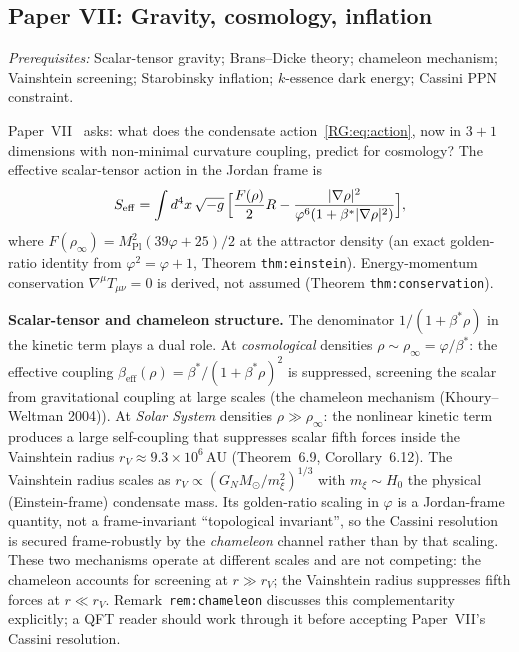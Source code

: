 \documentclass[11pt,a4paper]{article}
\newcommand{\vp}{\varphi}
\newcommand{\bst}{\beta^*}
\begin{document}
\subsection{Paper VII: Gravity, cosmology, inflation}

\textit{Prerequisites:} Scalar-tensor gravity; Brans--Dicke theory; chameleon
mechanism; Vainshtein screening;
Starobinsky inflation; $k$-essence dark energy; Cassini PPN constraint.

Paper~VII~\cite{Paper7} asks: what does the condensate action~\eqref{RG:eq:action}, now in $3+1$
dimensions with non-minimal curvature coupling, predict for cosmology?
The effective scalar-tensor action in the Jordan frame is
\begin{equation}
  S_{\mathrm{eff}} = \int d^4x\,\sqrt{-g}\,
  \Bigl[\frac{F(\rho)}{2}R - \frac{|\nabla\rho|^2}{\vp^6(1+\bst|\nabla\rho|^2)}\Bigr],
  \label{RG:eq:Seff}
\end{equation}
where $F(\rho_\infty) = M_{\mathrm{Pl}}^2(39\vp+25)/2$ at the attractor density
(an exact golden-ratio identity from $\vp^2=\vp+1$, Theorem \texttt{thm:einstein}).
Energy-momentum conservation $\nabla^\mu T_{\mu\nu}=0$ is derived, not assumed
(Theorem \texttt{thm:conservation}).

\textbf{Scalar-tensor and chameleon structure.}
The denominator $1/(1+\bst\rho)$ in the kinetic term plays a dual role.
At \emph{cosmological} densities $\rho\sim\rho_\infty=\vp/\bst$:
the effective coupling $\beta_{\mathrm{eff}}(\rho) = \bst/(1+\bst\rho)^2$
is suppressed, screening the scalar from gravitational coupling at large scales
(the chameleon mechanism (Khoury--Weltman 2004)).
At \emph{Solar System} densities $\rho\gg\rho_\infty$:
the nonlinear kinetic term produces a large self-coupling that suppresses
scalar fifth forces inside the Vainshtein radius
$r_V \approx 9.3\times10^6\,\mathrm{AU}$ (Theorem~6.9,
Corollary~6.12).
The Vainshtein radius scales as
$r_V \propto (G_N M_\odot / m_\xi^2)^{1/3}$
with $m_\xi \sim H_0$ the physical (Einstein-frame) condensate mass.
Its golden-ratio scaling in $\vp$ is a Jordan-frame quantity, not a
frame-invariant ``topological invariant'', so the Cassini resolution is
secured frame-robustly by the \emph{chameleon} channel rather than by that
scaling.
These two mechanisms operate at different scales and are not competing:
the chameleon accounts for screening at $r\gg r_V$; the Vainshtein
radius suppresses fifth forces at $r\ll r_V$.
Remark~\texttt{rem:chameleon} discusses this complementarity explicitly;
a QFT reader should work through it before accepting Paper~VII's
Cassini resolution.
\end{document}
